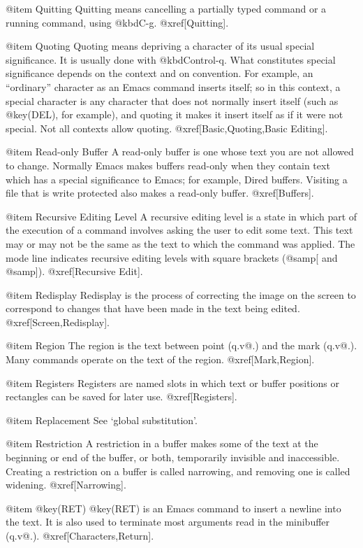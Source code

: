 @item Quitting
Quitting means cancelling a partially typed command or a running command,
using @kbd{C-g}.  @xref[Quitting].

@item Quoting
Quoting means depriving a character of its usual special significance.  It
is usually done with @kbd{Control-q}.  What constitutes special
significance depends on the context and on convention.  For example, an
``ordinary'' character as an Emacs command inserts itself; so in this
context, a special character is any character that does not normally insert
itself (such as @key(DEL), for example), and quoting it makes it insert
itself as if it were not special.  Not all contexts allow quoting.
@xref[Basic,Quoting,Basic Editing].

@item Read-only Buffer
A read-only buffer is one whose text you are not allowed to change.
Normally Emacs makes buffers read-only when they contain text which has a
special significance to Emacs; for example, Dired buffers.  Visiting a file
that is write protected also makes a read-only buffer.  @xref[Buffers].

@item Recursive Editing Level
A recursive editing level is a state in which part of the execution of a
command involves asking the user to edit some text.  This text may or may
not be the same as the text to which the command was applied.  The mode
line indicates recursive editing levels with square brackets (@samp{[} and
@samp{]}).  @xref[Recursive Edit].

@item Redisplay
Redisplay is the process of correcting the image on the screen to
correspond to changes that have been made in the text being edited.
@xref[Screen,Redisplay].

@item Region
The region is the text between point (q.v@.) and the mark (q.v@.).  Many
commands operate on the text of the region.  @xref[Mark,Region].

@item Registers
Registers are named slots in which text or buffer positions or rectangles
can be saved for later use.  @xref[Registers].

@item Replacement
See `global substitution'.

@item Restriction
A restriction in a buffer makes some of the text at the beginning
or end of the buffer, or both, temporarily invisible and inaccessible.
Creating a restriction on a buffer is called narrowing, and
removing one is called widening.  @xref[Narrowing].

@item @key(RET)
@key(RET) is an Emacs command to insert a newline into the text.
It is also used to terminate most arguments read in the minibuffer (q.v@.).
@xref[Characters,Return].

